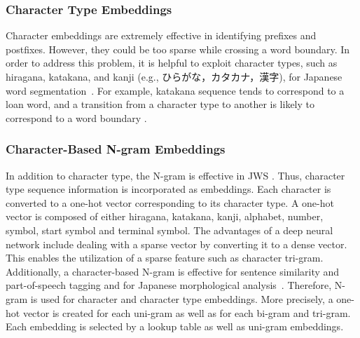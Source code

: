\documentclass[11pt,letterpaper]{article}
\begin{document}

\subsubsection{Character Type Embeddings}
Character embeddings are extremely effective in identifying prefixes and postfixes. However, they could be too sparse while crossing a word boundary. In order to address this problem, it is helpful to exploit character types, such as hiragana, katakana, and kanji (e.g., ひらがな，カタカナ，漢字), for Japanese word segmentation~\cite{neubig-nakata-mori:2011:ACL-HLT2011}. For example, katakana sequence tends to correspond to a loan word, and a transition from a character type to another is likely to correspond to a word boundary \cite{nagata1999part}. 



\subsubsection{Character-Based N-gram Embeddings}
In addition to character type, the N-gram is effective in JWS \cite{neubig-nakata-mori:2011:ACL-HLT2011}.
Thus, character type sequence information is incorporated as embeddings. 
Each character is converted to a one-hot vector
corresponding to its character type. A one-hot vector is composed of either hiragana, katakana, kanji, alphabet, number, symbol, start symbol and terminal symbol. 
The advantages of a deep neural network include dealing with a sparse vector by converting it to a dense vector. 
This enables the utilization of a sparse feature such as character tri-gram. 
Additionally, a character-based N-gram is effective for sentence similarity and part-of-speech tagging \cite{wieting-EtAl:2016:EMNLP2016} and for Japanese morphological analysis~\cite{neubig-nakata-mori:2011:ACL-HLT2011}. Therefore, N-gram is used for character and character type embeddings.
More precisely, a one-hot vector is created for each uni-gram as well as for each bi-gram and tri-gram.
Each embedding is selected by a lookup table as well as uni-gram embeddings.
\end{document}
